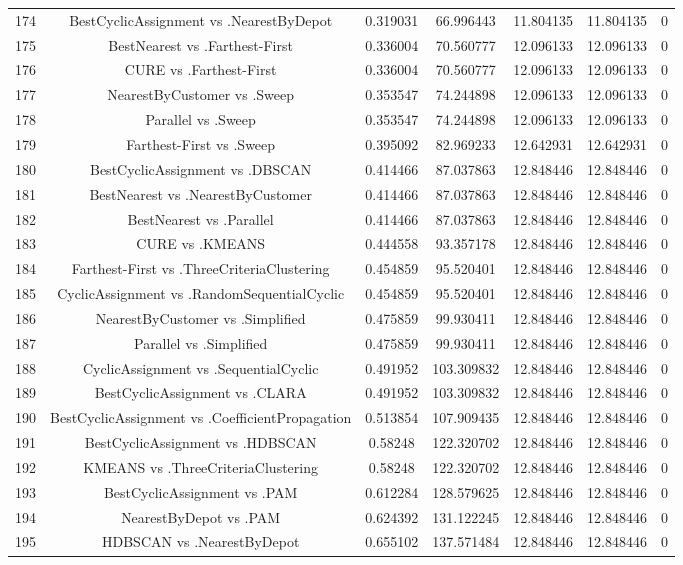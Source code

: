 \documentclass[a4paper,10pt]{article}
\begin{document}
\begin{landscape}
\begin{table}[!htp]
\begin{tabular}{ccccccc}
174&BestCyclicAssignment vs .NearestByDepot&0.319031&66.996443&11.804135&11.804135&0\\
175&BestNearest vs .Farthest-First&0.336004&70.560777&12.096133&12.096133&0\\
176&CURE vs .Farthest-First&0.336004&70.560777&12.096133&12.096133&0\\
177&NearestByCustomer vs .Sweep&0.353547&74.244898&12.096133&12.096133&0\\
178&Parallel vs .Sweep&0.353547&74.244898&12.096133&12.096133&0\\
179&Farthest-First vs .Sweep&0.395092&82.969233&12.642931&12.642931&0\\
180&BestCyclicAssignment vs .DBSCAN&0.414466&87.037863&12.848446&12.848446&0\\
181&BestNearest vs .NearestByCustomer&0.414466&87.037863&12.848446&12.848446&0\\
182&BestNearest vs .Parallel&0.414466&87.037863&12.848446&12.848446&0\\
183&CURE vs .KMEANS&0.444558&93.357178&12.848446&12.848446&0\\
184&Farthest-First vs .ThreeCriteriaClustering&0.454859&95.520401&12.848446&12.848446&0\\
185&CyclicAssignment vs .RandomSequentialCyclic&0.454859&95.520401&12.848446&12.848446&0\\
186&NearestByCustomer vs .Simplified&0.475859&99.930411&12.848446&12.848446&0\\
187&Parallel vs .Simplified&0.475859&99.930411&12.848446&12.848446&0\\
188&CyclicAssignment vs .SequentialCyclic&0.491952&103.309832&12.848446&12.848446&0\\
189&BestCyclicAssignment vs .CLARA&0.491952&103.309832&12.848446&12.848446&0\\
190&BestCyclicAssignment vs .CoefficientPropagation&0.513854&107.909435&12.848446&12.848446&0\\
191&BestCyclicAssignment vs .HDBSCAN&0.58248&122.320702&12.848446&12.848446&0\\
192&KMEANS vs .ThreeCriteriaClustering&0.58248&122.320702&12.848446&12.848446&0\\
193&BestCyclicAssignment vs .PAM&0.612284&128.579625&12.848446&12.848446&0\\
194&NearestByDepot vs .PAM&0.624392&131.122245&12.848446&12.848446&0\\
195&HDBSCAN vs .NearestByDepot&0.655102&137.571484&12.848446&12.848446&0\\

\end{tabular}
\end{table}
\end{landscape}
\end{document}
